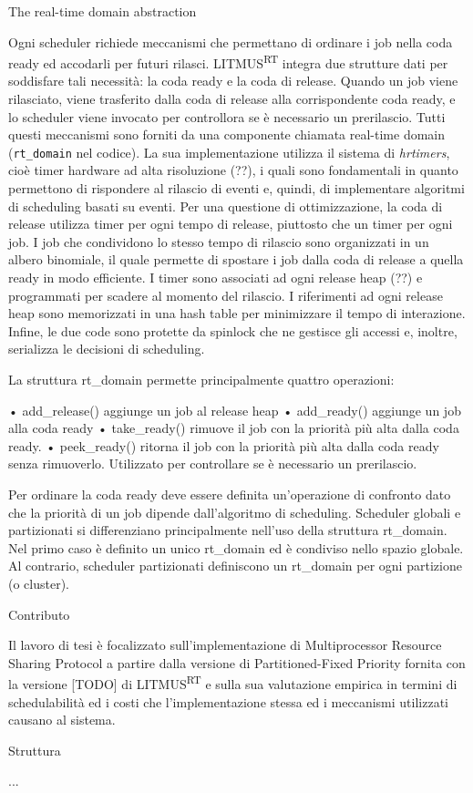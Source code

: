 The real-time domain abstraction

Ogni scheduler richiede meccanismi che permettano di ordinare i job nella coda ready ed accodarli per futuri rilasci. LITMUS\textsuperscript{RT} integra due strutture dati per soddisfare tali necessità: la coda ready e la coda di release. Quando un job viene rilasciato, viene trasferito dalla coda di release alla corrispondente coda ready, e lo scheduler viene invocato per controllora se è necessario un prerilascio. Tutti questi meccanismi sono forniti da una componente chiamata real-time domain (\texttt{rt_domain} nel codice). La sua implementazione utilizza il sistema di \textit{hrtimers}, cioè timer hardware ad alta risoluzione (??), i quali sono fondamentali in quanto permettono di rispondere al rilascio di eventi e, quindi, di implementare algoritmi di scheduling basati su eventi.
Per una questione di ottimizzazione, la coda di release utilizza timer per ogni tempo di release, piuttosto che un timer per ogni job. I job che condividono lo stesso tempo di rilascio sono organizzati in un albero binomiale, il quale permette di spostare i job dalla coda di release a quella ready in modo efficiente. I timer sono associati ad ogni release heap (??) e programmati per scadere al momento del rilascio. I riferimenti ad ogni release heap sono memorizzati in una hash table per minimizzare il tempo di interazione. Infine, le due code sono protette da spinlock che ne gestisce gli accessi e, inoltre, serializza le decisioni di scheduling.

La struttura rt_domain permette principalmente quattro operazioni:

• add_release() aggiunge un job al release heap
• add_ready() aggiunge un job alla coda ready
• take_ready() rimuove il job con la priorità più alta dalla coda ready. 
• peek_ready() ritorna il job con la priorità più alta dalla coda ready senza rimuoverlo. Utilizzato per controllare se è necessario un prerilascio.

Per ordinare la coda ready deve essere definita un'operazione di confronto dato che la priorità di un job dipende dall'algoritmo di scheduling.
Scheduler globali e partizionati si differenziano principalmente nell'uso della struttura rt_domain. Nel primo caso è definito un unico rt_domain ed è condiviso nello spazio globale. Al contrario, scheduler partizionati definiscono un rt_domain per ogni partizione (o cluster).

Contributo

Il lavoro di tesi è focalizzato sull'implementazione di Multiprocessor Resource Sharing Protocol a partire dalla versione di Partitioned-Fixed Priority fornita con la versione [TODO] di LITMUS\textsuperscript{RT} e sulla sua valutazione empirica in termini di schedulabilità ed i costi che l'implementazione stessa ed i meccanismi utilizzati causano al sistema.

Struttura

...




